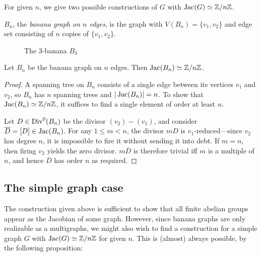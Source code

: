 \documentclass{amsart}
\begin{document}
For given $n$, we give two possible constructions of $G$ with $\operatorname{Jac}(G)
\simeq \mathbb{Z}/n\mathbb{Z}$.

\begin{defn}
  $B_n$, the \emph{banana graph on $n$ edges}, is the graph with
  $V(B_n) = \{v_1, v_2\}$ and edge set consisting of $n$ copies of
  $\{v_1, v_2\}$.
\end{defn}

\begin{figure}[h]
  \begin{center}
    \caption{The $3$-banana $B_3$}
  \end{center}
\end{figure}

\begin{prop}
  \label{prop:banana_cyclic}
  Let $B_n$ be the banana graph on $n$ edges. Then $\operatorname{Jac}(B_n) \simeq \mathbb{Z}/n\mathbb{Z}$.
\end{prop}

\begin{proof}
  A spanning tree on $B_n$ consists of a single edge between its
  vertices $v_1$ and $v_2$, so $B_n$ has $n$ spanning trees and
  $|\operatorname{Jac}(B_n)| = n$. To show that $\operatorname{Jac}(B_n) \simeq \mathbb{Z}/n\mathbb{Z}$, it
  suffices to find a single element of order at least $n$.

  Let $D \in \operatorname{Div}^0(B_n)$ be the divisor $(v_2) - (v_1)$, and consider
  $\overline{D} = [D] \in \operatorname{Jac}(B_n)$. For any $1 \le m < n$, the
  divisor $mD$ is $v_1$-reduced---since $v_2$ has degree $n$, it is
  impossible to fire it without sending it into debt. If $m=n$, then
  firing $v_2$ yields the zero divisor. $m\overline{D}$ is therefore
  trivial iff $m$ is a multiple of $n$, and hence $\overline{D}$ has
  order $n$ as required.
\end{proof}

\subsection{The simple graph case}
The construction given above is sufficient to show that all finite
abelian groups appear as the Jacobian of some graph. However, since
banana graphs are only realizable as a multigraphs, we might also wish
to find a construction for a simple graph $G$ with $\operatorname{Jac}(G) \simeq
\mathbb{Z}/n\mathbb{Z}$ for given $n$. This is (almost) always possible, by the
following proposition:
\end{document}
